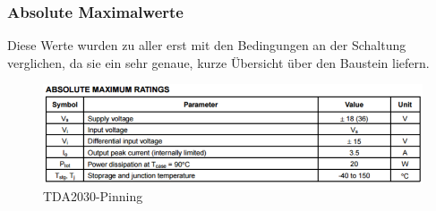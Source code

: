 \subsubsection{Absolute Maximalwerte}
Diese Werte wurden zu aller erst mit den Bedingungen an der Schaltung verglichen, da sie ein sehr genaue, kurze Übersicht über den Baustein liefern.
\begin{figure} [ht]
	\centering
	\includegraphics[width=1\textwidth]{img/Print5/TDA2030MaximumRatings.PNG}
	\caption{TDA2030-Pinning}
	\label {fig:abb5.3.3.2}
\end{figure}


